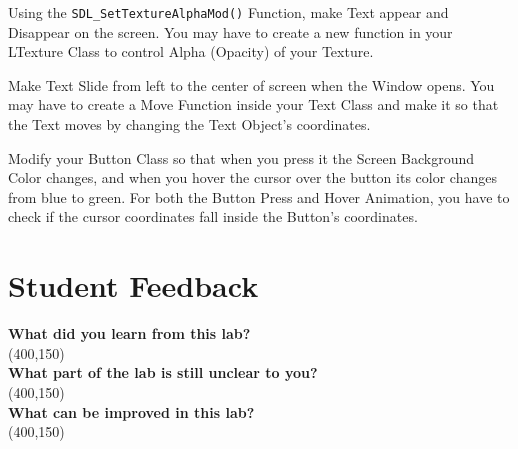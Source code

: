 \documentclass[11pt,fleqn]{book} %
\begin{document}
\begin{problem} Using the \texttt{SDL\_SetTextureAlphaMod()} Function, make Text appear and Disappear on the screen. You may have to create a new function in your LTexture Class to control Alpha (Opacity) of your Texture.\\
\end{problem}
\begin{problem} Make Text Slide from left to the center of screen when the Window opens. You may have to create a Move Function inside your Text Class and make it so that the Text moves by changing the Text Object's coordinates.\\
\end{problem}
\begin{problem} Modify your Button Class so that when you press it the Screen Background Color changes, and when you hover the cursor over the button its color changes from blue to green. For both the Button Press and Hover Animation, you have to check if the cursor coordinates fall inside the Button's coordinates.
\end{problem}

\newpage
\section{Student Feedback}
\textbf{What did you learn from this lab?}\\ 
\framebox(400,150){}\\
\textbf{What part of the lab is still unclear to you?}\\
\framebox(400,150){}\\
\textbf{What can be improved in this lab?}\\ 
\framebox(400,150){}\\
\end{document}
